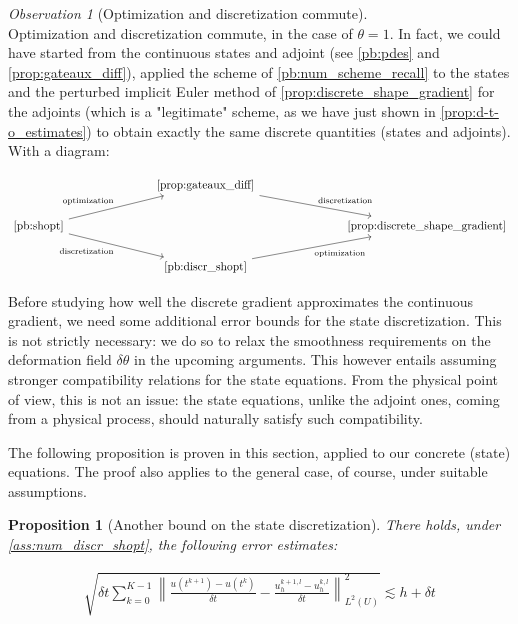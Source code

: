 \documentclass[english,a4paper,9pt,oneside]{scrbook}	%
\theoremstyle{break}
\newtheorem{prop}[equation]{Proposition}
\theoremstyle{remark}
\newtheorem{obs}[equation]{Observation}
\newcommand{\norm}[1]{\left\lVert#1\right\rVert}
\begin{document}
\begin{obs}[Optimization and discretization commute]
\mbox{}\\
Optimization and discretization commute, in the case of $\theta=1$. In fact, we could have started from the continuous states and adjoint (see \cref{pb:pdes} and \cref{prop:gateaux_diff}), applied the scheme of \cref{pb:num_scheme_recall} to the states and the perturbed implicit Euler method of \cref{prop:discrete_shape_gradient} for the adjoints (which is a "legitimate" scheme, as we have just shown in \cref{prop:d-t-o_estimates}) to obtain exactly the same discrete quantities (states and adjoints).\mbox{}\\
With a diagram:

\[\begin{tikzcd}
	&&& \text{\cref{prop:gateaux_diff}} \\
	\text{\cref{pb:shopt}} &&&&&& \text{\cref{prop:discrete_shape_gradient}}  \\
	&&& \text{\cref{pb:discr_shopt}} 
	\arrow["{\text{optimization}}"', from=3-4, to=2-7]
	\arrow["{\text{discretization}}", from=1-4, to=2-7]
	\arrow["{\text{optimization}}", from=2-1, to=1-4]
	\arrow["{\text{discretization}}"', from=2-1, to=3-4]
\end{tikzcd}\]


\end{obs}


Before studying how well the discrete gradient approximates the continuous gradient, we need some additional error bounds for the state discretization. This is not strictly necessary: we do so to relax the smoothness requirements on the deformation field $\delta \theta$ in the upcoming arguments. This however entails assuming stronger compatibility relations for the state equations. From the physical point of view, this is not an issue: the state equations, unlike the adjoint ones, coming from a physical process, should naturally satisfy such compatibility. 

The following proposition is proven in this section, applied to our concrete (state) equations. The proof also applies to the general case, of course, under suitable assumptions.

\begin{prop}[Another bound on the state discretization]
\label{prop:another_bound}
There holds, under \cref{ass:num_discr_shopt}, the following error estimates:

\begin{align*}
	\sqrt{\delta t \sum_{k=0}^{K-1} \norm{\frac{u(t^{k+1})-u(t^k)}{\delta t} - \frac{u_h^{k+1,l}-u_h^{k, l}}{\delta t}}_{L^2(U)}^2}\lesssim h + \delta t
\end{align*}

\end{prop}
\end{document}
